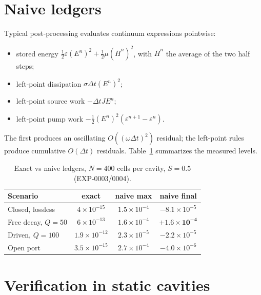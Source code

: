 \documentclass[aps,pre,reprint,superscriptaddress,amsmath,amssymb]{revtex4-2}
\begin{document}
\section{Naive ledgers}

Typical post-processing evaluates continuum expressions pointwise:

\begin{itemize}
\item stored energy $\tfrac12\varepsilon(E^n)^2+\tfrac12\mu(\bar H^n)^2$, with
  $\bar H^n$ the average of the two half steps;
\item left-point dissipation $\sigma\Delta t(E^n)^2$;
\item left-point source work $-\Delta tJE^n$;
\item left-point pump work $-\tfrac12(E^n)^2(\varepsilon^{n+1}-\varepsilon^n)$.
\end{itemize}

The first produces an oscillating $O((\omega\Delta t)^2)$ residual; the left-point
rules produce cumulative $O(\Delta t)$ residuals. Table~\ref{tab:naive} summarizes
the measured levels.

\begin{table}[t]
\caption{Exact vs naive ledgers, $N=400$ cells per cavity, $S=0.5$ (EXP-0003/0004).}
\label{tab:naive}
\begin{ruledtabular}
\begin{tabular}{lccc}
Scenario & exact & naive max & naive final \\
\hline
Closed, lossless & $4\times10^{-15}$ & $1.5\times10^{-4}$ & $-8.1\times10^{-5}$\\
Free decay, $Q=50$ & $6\times10^{-13}$ & $1.6\times10^{-4}$ & $\bm{+1.6\times10^{-4}}$\\
Driven, $Q=100$ & $1.9\times10^{-12}$ & $2.3\times10^{-5}$ & $-2.2\times10^{-5}$\\
Open port & $3.5\times10^{-15}$ & $2.7\times10^{-4}$ & $-4.0\times10^{-6}$\\
\end{tabular}
\end{ruledtabular}
\end{table}

\section{Verification in static cavities}
\end{document}
